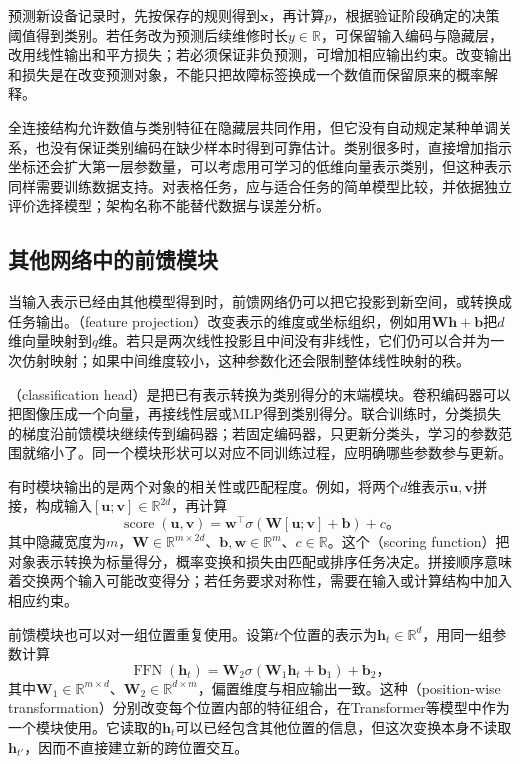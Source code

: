 预测新设备记录时，先按保存的规则得到$\bm{x}$，再计算$p$，根据验证阶段确定的决策阈值得到类别。若任务改为预测后续维修时长$y\in\mathbb{R}$，可保留输入编码与隐藏层，改用线性输出和平方损失；若必须保证非负预测，可增加相应输出约束。改变输出和损失是在改变预测对象，不能只把故障标签换成一个数值而保留原来的概率解释。

全连接结构允许数值与类别特征在隐藏层共同作用，但它没有自动规定某种单调关系，也没有保证类别编码在缺少样本时得到可靠估计。类别很多时，直接增加指示坐标还会扩大第一层参数量，可以考虑用可学习的低维向量表示类别，但这种表示同样需要训练数据支持。对表格任务，应与适合任务的简单模型比较，并依据独立评价选择模型；架构名称不能替代数据与误差分析。

\subsection{其他网络中的前馈模块}
\label{sec:ffn-modules}

当输入表示已经由其他模型得到时，前馈网络仍可以把它投影到新空间，或转换成任务输出。（feature projection）改变表示的维度或坐标组织，例如用$\bm{W}\bm{h}+\bm{b}$把$d$维向量映射到$q$维。若只是两次线性投影且中间没有非线性，它们仍可以合并为一次仿射映射；如果中间维度较小，这种参数化还会限制整体线性映射的秩。

（classification head）是把已有表示转换为类别得分的末端模块。卷积编码器可以把图像压成一个向量，再接线性层或MLP得到类别得分。联合训练时，分类损失的梯度沿前馈模块继续传到编码器；若固定编码器，只更新分类头，学习的参数范围就缩小了。同一个模块形状可以对应不同训练过程，应明确哪些参数参与更新。

有时模块输出的是两个对象的相关性或匹配程度。例如，将两个$d$维表示$\bm{u},\bm{v}$拼接，构成输入$[\bm{u};\bm{v}]\in\mathbb{R}^{2d}$，再计算
\begin{equation}
  \operatorname{score}(\bm{u},\bm{v})=
  \bm{w}^{\top}\sigma\!\left(\bm{W}[\bm{u};\bm{v}]+\bm{b}\right)+c\text{。}
  \label{eq:ffn-scoring-module}
\end{equation}
其中隐藏宽度为$m$，$\bm{W}\in\mathbb{R}^{m\times2d}$、$\bm{b},\bm{w}\in\mathbb{R}^{m}$、$c\in\mathbb{R}$。这个（scoring function）把对象表示转换为标量得分，概率变换和损失由匹配或排序任务决定。拼接顺序意味着交换两个输入可能改变得分；若任务要求对称性，需要在输入或计算结构中加入相应约束。

前馈模块也可以对一组位置重复使用。设第$t$个位置的表示为$\bm{h}_t\in\mathbb{R}^{d}$，用同一组参数计算
\begin{equation}
  \operatorname{FFN}(\bm{h}_t)=
  \bm{W}_2\sigma(\bm{W}_1\bm{h}_t+\bm{b}_1)+\bm{b}_2\text{，}
  \label{eq:ffn-positionwise-module}
\end{equation}
其中$\bm{W}_1\in\mathbb{R}^{m\times d}$、$\bm{W}_2\in\mathbb{R}^{d\times m}$，偏置维度与相应输出一致。这种（position-wise transformation）分别改变每个位置内部的特征组合，在Transformer等模型中作为一个模块使用。它读取的$\bm{h}_t$可以已经包含其他位置的信息，但这次变换本身不读取$\bm{h}_{t'}$，因而不直接建立新的跨位置交互。

